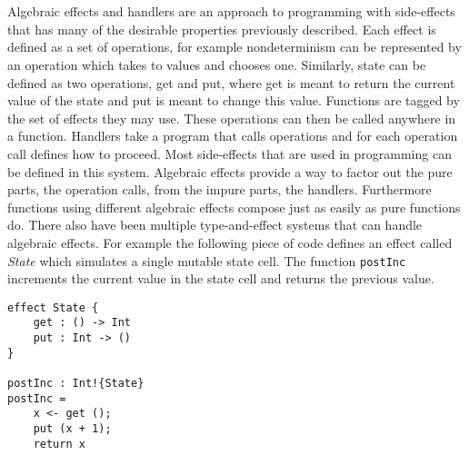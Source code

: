 \\\\
Algebraic effects and handlers\cite{algeff} are an approach to programming with side-effects that has many of the desirable properties previously described.
Each effect is defined as a set of operations, for example nondeterminism can be represented by an operation which takes to values and chooses one.
Similarly, state can be defined as two operations, get and put, where get is meant to return the current value of the state and put is meant to change this value.
Functions are tagged by the set of effects they may use.
These operations can then be called anywhere in a function.
Handlers take a program that calls operations and for each operation call defines how to proceed.
Most side-effects that are used in programming can be defined in this system.
Algebraic effects provide a way to factor out the pure parts, the operation calls, from the impure parts, the handlers.
Furthermore functions using different algebraic effects compose just as easily as pure functions do.
There also have been multiple type-and-effect systems that can handle algebraic effects\cite{eff2}\cite{koka1}\cite{links}.
For example the following piece of code defines an effect called \textit{State} which simulates a single mutable state cell.
The function \texttt{postInc} increments the current value in the state cell and returns the previous value.
\begin{verbatim}
effect State {
	get : () -> Int
	put : Int -> ()
}

postInc : Int!{State}
postInc =
	x <- get ();
	put (x + 1);
	return x
\end{verbatim}

